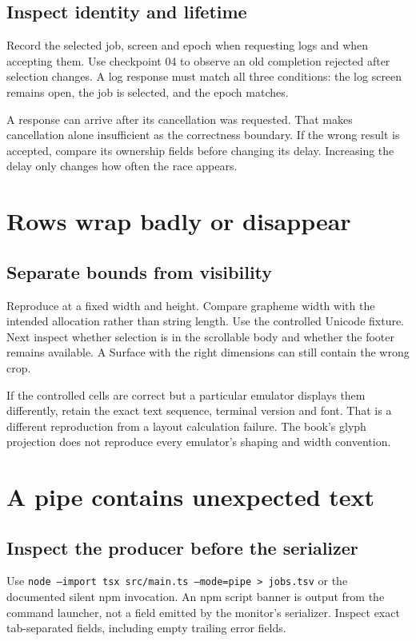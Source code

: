 \subsection{Inspect identity and lifetime}

Record the selected job, screen and epoch when requesting logs and when accepting them. Use checkpoint 04 to observe an old completion rejected after selection changes. A log response must match all three conditions: the log screen remains open, the job is selected, and the epoch matches.

A response can arrive after its cancellation was requested. That makes cancellation alone insufficient as the correctness boundary. If the wrong result is accepted, compare its ownership fields before changing its delay. Increasing the delay only changes how often the race appears.

\section{Rows wrap badly or disappear}
\subsection{Separate bounds from visibility}

Reproduce at a fixed width and height. Compare grapheme width with the intended allocation rather than string length. Use the controlled Unicode fixture. Next inspect whether selection is in the scrollable body and whether the footer remains available. A Surface with the right dimensions can still contain the wrong crop.

If the controlled cells are correct but a particular emulator displays them differently, retain the exact text sequence, terminal version and font. That is a different reproduction from a layout calculation failure. The book's glyph projection does not reproduce every emulator's shaping and width convention.

\section{A pipe contains unexpected text}
\subsection{Inspect the producer before the serializer}

Use \texttt{node --import tsx src/main.ts --mode=pipe > jobs.tsv} or the documented silent npm invocation. An npm script banner is output from the command launcher, not a field emitted by the monitor's serializer. Inspect exact tab-separated fields, including empty trailing error fields.

